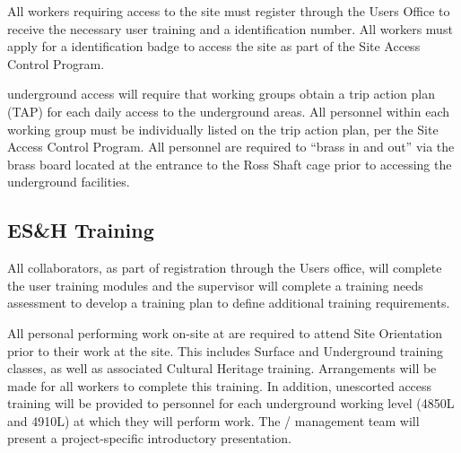 All  workers requiring access to the  site must
register through the \fnal Users Office to receive the necessary user
training and a \fnal identification number. All workers must apply for
a  identification badge to access the  site as part of
the  Site Access Control Program.

 underground access will require that working groups
obtain a trip action plan (TAP) for each daily access to the
underground areas.  All personnel within each working group must be
individually listed on the trip action plan, per the  Site
Access Control Program. All personnel are required to ``brass in and
out'' via the brass board located at the entrance to the Ross Shaft
cage prior to accessing the underground facilities.

\subsection{ES\&H Training}

All  collaborators, as part of registration through the \fnal Users office,
will complete the user  training modules and the supervisor
will complete a training needs assessment to develop a training plan
to define additional   training requirements.

\begin{comment}
All personal performing work on-site at \dword{surf} are required to
attend \dword{surf} \dword{esh} Site Orientation prior to performing
any work on-site.  The \dword{surf} Surface and Underground training
modules classes, including associated Cultural Heritage training, are
required to work on the site and arrangements will be made for all
workers to complete this training prior to beginning work. In
addition, unescorted access training will be provided to personnel for
each underground working level (4850L and 4910L) they will be required
to perform work.  The \dword{lbnf-dune} \dword{esh} management
team will present a project-specific introductory \dword{esh}
presentation.
\end{comment}
All personal performing work on-site at  are required to
attend   Site Orientation prior to their work at the site.  This includes  Surface and Underground training classes, as well as associated Cultural Heritage training. Arrangements will be made for all workers to complete this training. In
addition, unescorted access training will be provided to personnel for
each underground working level (4850L and 4910L) at which they will perform work.  The /  management
team will present a project-specific introductory 
presentation.

